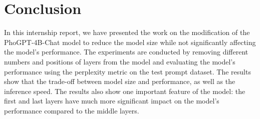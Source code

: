 \chapter*{Conclusion}

In this internship report, we have presented the work on the modification of the PhoGPT-4B-Chat model to reduce the model size while not significantly affecting the model's performance. The experiments are conducted by removing different numbers and positions of layers from the model and evaluating the model's performance using the perplexity metric on the test prompt dataset. The results show that the trade-off between model size and performance, as well as the inference speed. The results also show one important feature of the model: the first and last layers have much more significant impact on the model's performance compared to the middle layers. \par
